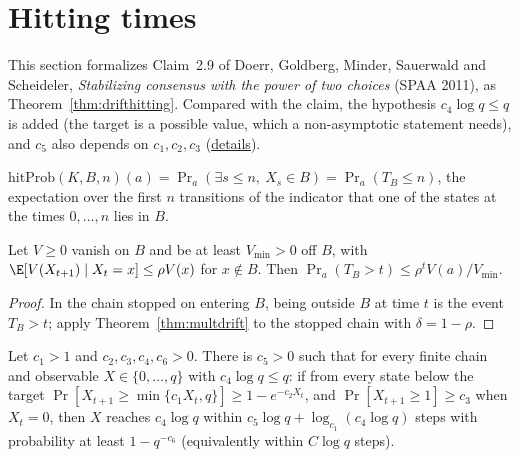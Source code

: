 \section{Hitting times}\label{sec:dgmss-hitting}
This section formalizes Claim~2.9 of Doerr, Goldberg, Minder, Sauerwald and Scheideler,
\emph{Stabilizing consensus with the power of two choices} (SPAA 2011), as
Theorem~\ref{thm:drifthitting}. Compared with the claim, the hypothesis $c_4\log q\le q$ is added
(the target is a possible value, which a non-asymptotic statement needs), and $c_5$ also depends
on $c_1,c_2,c_3$
(\href{https://github.com/formal-dynamics/leanamics/blob/main/dynamics/FORMALIZATION_DIFFERENCES.md#hitting-time-lemma-drifthitting-maj-8-doerr-et-al-spaa-2011-claim-29}{details}).
\begin{definition}\label{def:hitprob}
\leanok{}
$\mathrm{hitProb}(K,B,n)(a)=\Pr_a(\exists s\le n,\ X_s\in B)=\Pr_a(T_B\le n)$,
the expectation over the first $n$ transitions of the indicator that one of
the states at the times $0,\dots,n$ lies in $B$.
\end{definition}
\begin{lemma}\label{lem:hitdrift}
\leanok
{}
Let $V\ge0$ vanish on $B$ and be at least $V_{\min}>0$ off $B$, with
$\E[V(X_{t+1})\mid X_t=x]\le\rho V(x)$ for $x\notin B$. Then
$\Pr_a(T_B>t)\le\rho^tV(a)/V_{\min}$.
\end{lemma}
\begin{proof}\leanok
In the chain stopped on entering $B$, being outside $B$ at time $t$ is the
event $T_B>t$; apply Theorem~\ref{thm:multdrift} to the stopped chain with
$\delta=1-\rho$.
\end{proof}
\begin{theorem}\label{thm:drifthitting}
\leanok
{}
Let $c_1>1$ and $c_2,c_3,c_4,c_6>0$. There is $c_5>0$ such that for every
finite chain and observable $X\in\{0,\dots,q\}$ with $c_4\log q\le q$: if
from every state below the target $\Pr[X_{t+1}\ge\min\{c_1X_t,q\}]\ge
1-e^{-c_2X_t}$, and $\Pr[X_{t+1}\ge1]\ge c_3$ when $X_t=0$, then
$X$ reaches $c_4\log q$ within $c_5\log q+\log_{c_1}(c_4\log q)$ steps with
probability at least $1-q^{-c_6}$ (equivalently within $C\log q$ steps).
\end{theorem}
